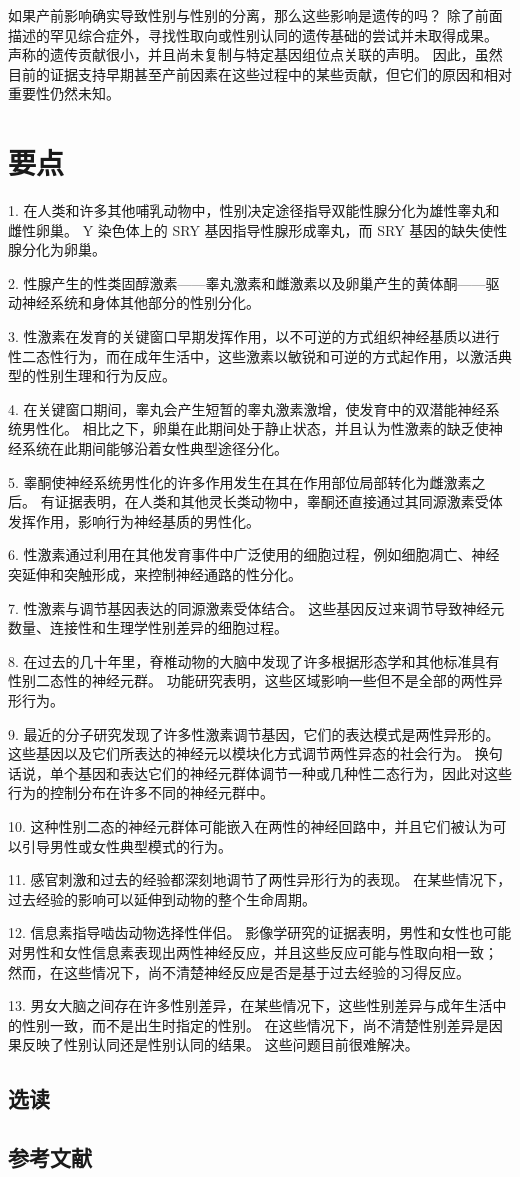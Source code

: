 如果产前影响确实导致性别与性别的分离，那么这些影响是遗传的吗？ 除了前面描述的罕见综合症外，寻找性取向或性别认同的遗传基础的尝试并未取得成果。 声称的遗传贡献很小，并且尚未复制与特定基因组位点关联的声明。 因此，虽然目前的证据支持早期甚至产前因素在这些过程中的某些贡献，但它们的原因和相对重要性仍然未知。

\section{要点}
1. 在人类和许多其他哺乳动物中，性别决定途径指导双能性腺分化为雄性睾丸和雌性卵巢。 Y 染色体上的 SRY 基因指导性腺形成睾丸，而 SRY 基因的缺失使性腺分化为卵巢。 

2. 性腺产生的性类固醇激素——睾丸激素和雌激素以及卵巢产生的黄体酮——驱动神经系统和身体其他部分的性别分化。 

3. 性激素在发育的关键窗口早期发挥作用，以不可逆的方式组织神经基质以进行性二态性行为，而在成年生活中，这些激素以敏锐和可逆的方式起作用，以激活典型的性别生理和行为反应。 

4. 在关键窗口期间，睾丸会产生短暂的睾丸激素激增，使发育中的双潜能神经系统男性化。 相比之下，卵巢在此期间处于静止状态，并且认为性激素的缺乏使神经系统在此期间能够沿着女性典型途径分化。 

5. 睾酮使神经系统男性化的许多作用发生在其在作用部位局部转化为雌激素之后。 有证据表明，在人类和其他灵长类动物中，睾酮还直接通过其同源激素受体发挥作用，影响行为神经基质的男性化。 

6. 性激素通过利用在其他发育事件中广泛使用的细胞过程，例如细胞凋亡、神经突延伸和突触形成，来控制神经通路的性分化。 

7. 性激素与调节基因表达的同源激素受体结合。 这些基因反过来调节导致神经元数量、连接性和生理学性别差异的细胞过程。 

8. 在过去的几十年里，脊椎动物的大脑中发现了许多根据形态学和其他标准具有性别二态性的神经元群。 功能研究表明，这些区域影响一些但不是全部的两性异形行为。 

9. 最近的分子研究发现了许多性激素调节基因，它们的表达模式是两性异形的。 这些基因以及它们所表达的神经元以模块化方式调节两性异态的社会行为。 换句话说，单个基因和表达它们的神经元群体调节一种或几种性二态行为，因此对这些行为的控制分布在许多不同的神经元群中。 

10. 这种性别二态的神经元群体可能嵌入在两性的神经回路中，并且它们被认为可以引导男性或女性典型模式的行为。

11. 感官刺激和过去的经验都深刻地调节了两性异形行为的表现。 在某些情况下，过去经验的影响可以延伸到动物的整个生命周期。 

12. 信息素指导啮齿动物选择性伴侣。 影像学研究的证据表明，男性和女性也可能对男性和女性信息素表现出两性神经反应，并且这些反应可能与性取向相一致； 然而，在这些情况下，尚不清楚神经反应是否是基于过去经验的习得反应。 

13. 男女大脑之间存在许多性别差异，在某些情况下，这些性别差异与成年生活中的性别一致，而不是出生时指定的性别。 在这些情况下，尚不清楚性别差异是因果反映了性别认同还是性别认同的结果。 这些问题目前很难解决。

\subsection{选读}
\subsection{参考文献}
